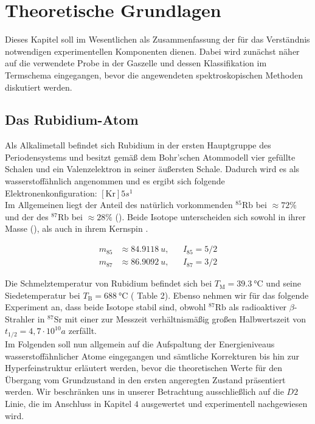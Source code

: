\chapter{Theoretische Grundlagen}
\label{chap:theoretical-basics}

\noindent Dieses Kapitel soll im Wesentlichen als Zusammenfassung der für das Verständnis notwendigen experimentellen Komponenten dienen. Dabei wird zunächst näher auf die verwendete Probe in der Gaszelle und dessen  Klassifikation im Termschema eingegangen, bevor die angewendeten spektroskopischen Methoden diskutiert werden.

\section{Das Rubidium-Atom}

\noindent Als Alkalimetall befindet sich Rubidium  in der ersten Hauptgruppe des Periodensystems und besitzt gemäß dem Bohr'schen Atommodell vier gefüllte Schalen und ein Valenzelektron in seiner äußersten Schale. Dadurch wird es als wasserstoffähnlich angenommen und es ergibt sich folgende Elektronenkonfiguration: $[\text{Kr}]5s^{1}$\\
\noindent Im Allgemeinen liegt der Anteil des natürlich vorkommenden $^{85}\text{Rb}$ bei $\approx72\%$ und der des $^{87}\text{Rb}$ bei $\approx28\%$ (\cite{H2}). Beide Isotope unterscheiden sich sowohl in ihrer Masse (\cite{MassRb}), als auch in ihrem Kernspin \cite{H2}.

\begin{align}
    m_{85} & \approx \SI{84,9118}{u}, && I_{85} = 5/2 \\
    m_{87} & \approx \SI{86,9092}{u}, && I_{87} = 3/2 
\end{align}

\noindent Die Schmelztemperatur von Rubidium befindet sich bei $T_{\text{M}} = \SI{39,3}{\celsius}$ und seine Siedetemperatur bei $T_{\text{B}} = \SI{688}{\celsius}$ (\cite{Steck85} Table 2). Ebenso nehmen wir für das folgende Experiment an, dass beide Isotope stabil sind, obwohl $^{87}\text{Rb}$ als radioaktiver $\beta$-Strahler in $^{87}\text{Sr}$ mit einer zur Messzeit verhältnismäßig großen Halbwertszeit von ${t_{1/2}}= 4,7 \cdot 10^{10}a$ zerfällt. \cite{HWZ}\\

\noindent Im Folgenden soll nun allgemein auf die Aufspaltung der Energieniveaus wasserstoffähnlicher Atome eingegangen und sämtliche Korrekturen bis hin zur Hyperfeinstruktur erläutert werden, bevor die theoretischen Werte für den Übergang vom Grundzustand in den ersten angeregten Zustand präsentiert werden. Wir beschränken uns in unserer Betrachtung ausschließlich auf die $D2$ Linie, die im Anschluss in Kapitel $4$ ausgewertet und experimentell nachgewiesen wird.

